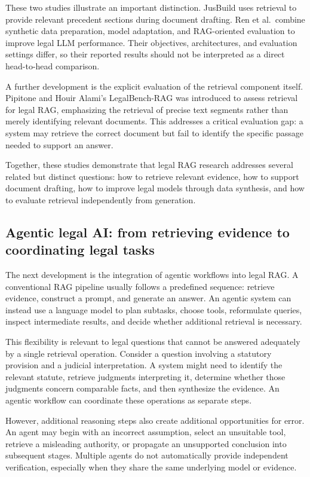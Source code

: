These two studies illustrate an important distinction. JusBuild uses retrieval to provide relevant
precedent sections during document drafting. Ren et al.\ combine synthetic data preparation, model
adaptation, and RAG-oriented evaluation to improve legal LLM performance. Their objectives,
architectures, and evaluation settings differ, so their reported results should not be interpreted as
a direct head-to-head comparison.

A further development is the explicit evaluation of the retrieval component itself. Pipitone and Houir
Alami's LegalBench-RAG \citep{pipitone2024} was introduced to assess retrieval for legal RAG,
emphasizing the retrieval of precise text segments rather than merely identifying relevant documents. This addresses a critical
evaluation gap: a system may retrieve the correct document but fail to identify the specific passage
needed to support an answer.

Together, these studies demonstrate that legal RAG research addresses several related but distinct
questions: how to retrieve relevant evidence, how to support document drafting, how to improve legal
models through data synthesis, and how to evaluate retrieval independently from generation.

\subsection{Agentic legal AI: from retrieving evidence to coordinating legal tasks}

The next development is the integration of agentic workflows into legal RAG. A conventional RAG
pipeline usually follows a predefined sequence: retrieve evidence, construct a prompt, and generate
an answer. An agentic system can instead use a language model to plan subtasks, choose tools,
reformulate queries, inspect intermediate results, and decide whether additional retrieval is
necessary.

This flexibility is relevant to legal questions that cannot be answered adequately by a single
retrieval operation. Consider a question involving a statutory provision and a judicial
interpretation. A system might need to identify the relevant statute, retrieve judgments interpreting
it, determine whether those judgments concern comparable facts, and then synthesize the evidence. An
agentic workflow can coordinate these operations as separate steps.

However, additional reasoning steps also create additional opportunities for error. An agent may
begin with an incorrect assumption, select an unsuitable tool, retrieve a misleading authority, or
propagate an unsupported conclusion into subsequent stages. Multiple agents do not automatically
provide independent verification, especially when they share the same underlying model or evidence.

